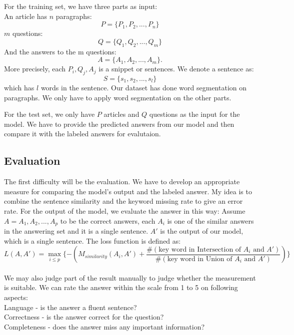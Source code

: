 \documentclass{article}
\begin{document}
For the training set, we have three parts as input: \\
An article has $n$ paragraphs:
\begin{equation}
P=\{P_1, P_2, ..., P_n\}
\end{equation} 
$m$ questions:
\begin{equation}
 Q=\{Q_1, Q_2, ..., Q_m\}
\end{equation}
And the answers to the m questions:
 \begin{equation}
 A=\{A_1, A_2, ..., A_m\}.
 \end{equation}
More precisely, each $P_i, Q_j, A_j$ is a snippet or sentences. We denote a sentence as:
\begin{equation}
S = \{s_1, s_2, ..., s_l\}
\end{equation}
which has $l$ words in the sentence. Our dataset has done word segmentation on paragraphs. We only have to apply word segmentation on the other parts.

For the test set, we only have $P$ articles and $Q$ questions as the input for the model. We have to provide the predicted answers from our model and then compare it with the labeled answers for evalutaion.

\subsection{Evaluation}
The first difficulty will be the evaluation. We have to develop an appropriate measure for comparing the model's output and the labeled answer. My idea is to combine the sentence similarity and the keyword missing rate to give an error rate. 
For the output of the model, we evaluate the answer in this way:
Assume $A={A_1, A_2, ..., A_p}$ to be the correct answers, each $A_i$ is one of the similar answers in the answering set and it is a single sentence. $A'$ is the output of our model, which is a single sentence.
The loss function is defined as:
\begin{equation}
L(A, A')=\max_{i \leq p}\{ -(M_{similarity}(A_i, A') + \frac{\#(\text{key word in Intersection of } A_i \text{ and } A')}{\#(\text{key word in Union of } A_i \text{ and }A')})\}
\end{equation}\\
We may also judge part of the result manually to judge whether the measurement is suitable. 
We can rate the answer within the scale from 1 to 5 on following aspects: \\
Language - is the answer a fluent sentence? \\
Correctness - is the answer correct for the question? \\
Completeness - does the answer miss any important information?\\
\end{document}
